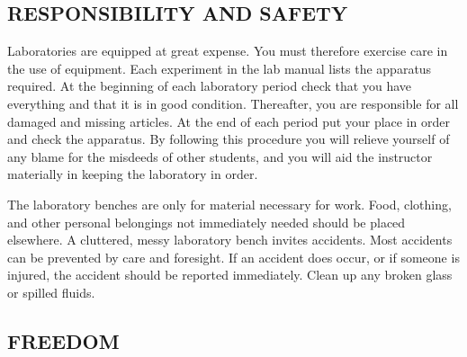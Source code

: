 \subsection*{RESPONSIBILITY AND SAFETY}
\begin{comment} \subsection*{ORDERLINESS AND SAFETY} \end{comment}

Laboratories are equipped at great expense.  You must therefore exercise care in the use of equipment.  Each experiment in the lab manual lists the apparatus required.  At the beginning of each laboratory period check that you have everything and that it is in good condition.  Thereafter, you are responsible for all damaged and missing articles.  At the end of each period put your place in order and check the apparatus.  By following this procedure you will relieve yourself of any blame for the misdeeds of other students, and you will aid the instructor materially in keeping the laboratory in order.

The laboratory benches are only for material necessary for work.  Food, clothing, and other personal belongings not immediately needed should be placed elsewhere.  A cluttered, messy laboratory bench invites accidents.  Most accidents can be prevented by care and foresight.  If an accident does occur, or if someone is injured, the accident should be reported immediately.  Clean up any broken glass or spilled fluids.

\begin{comment}
\subsection*{ORDERLINESS AND DISCIPLINE}
The laboratory benches are for work materials only. Clothing and other personal belongings should be placed elsewhere. A cluttered, messy bench invites accidents, most of which can be prevented by care and foresight. Any accident or injury should be reported immediately, and any broken glass or spilled fluids should be cleaned up promptly.
\end{comment}

\subsection*{FREEDOM}
\begin{comment} \subsection*{FREEDOM AND RESPONSIBILITY} \end{comment}


